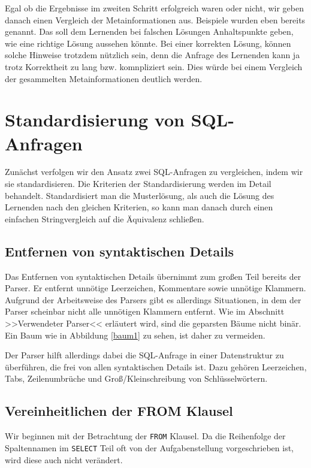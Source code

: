 Egal ob die Ergebnisse im zweiten Schritt erfolgreich waren oder nicht, wir geben danach einen Vergleich der Metainformationen aus. Beispiele wurden eben bereits genannt. Das soll dem Lernenden bei falschen Lösungen Anhaltspunkte geben, wie eine richtige Lösung aussehen könnte. Bei einer korrekten Lösung, können solche Hinweise trotzdem nützlich sein, denn die Anfrage des Lernenden kann ja trotz Korrektheit zu lang bzw. komnpliziert sein. Dies würde bei einem Vergleich der gesammelten Metainformationen deutlich werden.

\section{Standardisierung von SQL-Anfragen}

Zunächst verfolgen wir den Ansatz zwei SQL-Anfragen zu vergleichen, indem wir sie standardisieren. Die Kriterien der Standardisierung werden im Detail behandelt. Standardisiert man die Musterlösung, als auch die Lösung des Lernenden nach den gleichen Kriterien, so kann man danach durch einen einfachen Stringvergleich auf die Äquivalenz schließen. 

\subsection{Entfernen von syntaktischen Details}

Das Entfernen von syntaktischen Details übernimmt zum großen Teil bereits der Parser. Er entfernt unnötige Leerzeichen, Kommentare sowie unnötige Klammern. Aufgrund der Arbeitsweise des Parsers gibt es allerdings Situationen, in dem der Parser scheinbar nicht alle unnötigen Klammern entfernt. Wie im Abschnitt >>Verwendeter Parser<< erläutert wird, sind die geparsten Bäume nicht binär. Ein Baum wie in Abbildung \ref{baum1} zu sehen, ist daher zu vermeiden. 

Der Parser hilft allerdings dabei die SQL-Anfrage in einer Datenstruktur zu überführen, die frei von allen syntaktischen Details ist. Dazu gehören Leerzeichen, Tabs, Zeilenumbrüche und Groß/Kleinschreibung von Schlüsselwörtern.

\subsection{Vereinheitlichen der FROM Klausel}

Wir beginnen mit der Betrachtung der \verb|FROM| Klausel. Da die Reihenfolge der Spaltennamen im \verb|SELECT| Teil oft von der Aufgabenstellung vorgeschrieben ist, wird diese auch nicht verändert.

